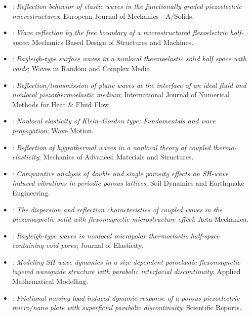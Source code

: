 \begin{itemize}
\item \citet{Liu2020}: \emph{Reflection behavior of elastic waves in the functionally graded piezoelectric microstructures}; European Journal of Mechanics - A/Solids.
\item \citet{Singh2020c}: \emph{Wave reflection by the free boundary of a microstructured flexoelectric half-space}; Mechanics Based Design of Structures and Machines.
\item \citet{Singh2020e}: \emph{Rayleigh-type surface waves in a nonlocal thermoelastic solid half space with voids}; Waves in Random and Complex Media.
\item \citet{Gupta2023IJNMF}: \emph{Reflection/transmission of plane waves at the interface of an ideal fluid and nonlocal piezothermoelastic medium}; International Journal of Numerical Methods for Heat \& Fluid Flow.
\item \citet{Lazar2022}: \emph{Nonlocal elasticity of Klein–Gordon type: Fundamentals and wave propagation}; Wave Motion.
\item \citet{Yadav2022}: \emph{Reflection of hygrothermal waves in a nonlocal theory of coupled thermo-elasticity}; Mechanics of Advanced Materials and Structures.
\item \citet{Dutta2024}: \emph{Comparative analysis of double and single porosity effects on SH-wave induced vibrations in periodic porous lattices}; Soil Dynamics and Earthquake Engineering.
\item \citet{Jiao2024}: \emph{The dispersion and reflection characteristics of coupled waves in the piezomagnetic solid with flexomagnetic microstructure effect}; Acta Mechanica.
\item \citet{Kumar2024b}: \emph{Rayleigh-type waves in nonlocal micropolar thermoelastic half-space containing void pores}; Journal of Elasticity.
\item \citet{Gupta2026}: \emph{Modeling SH-wave dynamics in a size-dependent poroelastic-flexomagnetic layered waveguide structure with parabolic interfacial discontinuity}; Applied Mathematical Modelling.
\item \citet{Meghana2026a}: \emph{Frictional moving load-induced dynamic response of a porous piezoelectric micro/nano plate with superficial parabolic discontinuity}; Scientific Reports.
\end{itemize}

